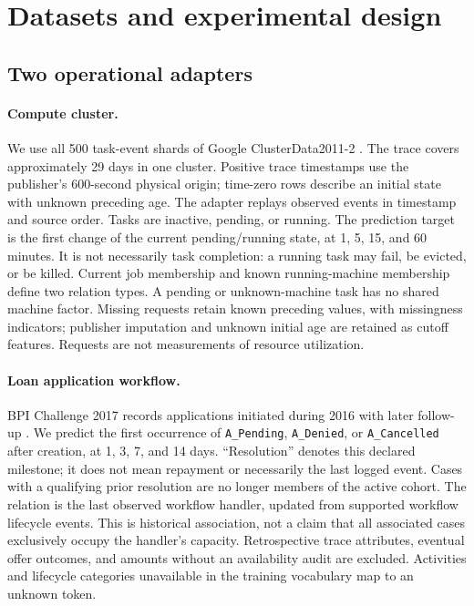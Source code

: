 \section{Datasets and experimental design}
\subsection{Two operational adapters}
\paragraph{Compute cluster.}
We use all 500 task-event shards of Google ClusterData2011-2
\citep{google2011}. The trace covers approximately 29 days in one cluster.
Positive trace timestamps use the publisher's 600-second physical origin;
time-zero rows describe an initial state with unknown preceding age. The
adapter replays observed events in timestamp and source order. Tasks are
inactive, pending, or running. The prediction target is the first change of
the current pending/running state, at 1, 5, 15, and 60 minutes. It is not
necessarily task completion: a running task may fail, be evicted, or be killed.
Current job membership and known running-machine membership define two
relation types. A pending or unknown-machine task has no shared machine factor.
Missing requests retain known preceding values, with missingness indicators;
publisher imputation and unknown initial age are retained as cutoff features.
Requests are not measurements of resource utilization.

\paragraph{Loan application workflow.}
BPI Challenge 2017 records applications initiated during 2016 with later
follow-up \citep{vandongen2017}. We predict the first occurrence of
\texttt{A\_Pending}, \texttt{A\_Denied}, or \texttt{A\_Cancelled} after creation,
at 1, 3, 7, and 14 days. ``Resolution'' denotes this declared milestone; it
does not mean repayment or necessarily the last logged event. Cases with a
qualifying prior resolution are no longer members of the active cohort.
The relation is the last observed workflow handler, updated from supported
workflow lifecycle events. This is historical association, not a claim that
all associated cases exclusively occupy the handler's capacity. Retrospective
trace attributes, eventual offer outcomes, and amounts without an availability
audit are excluded. Activities and lifecycle categories unavailable in the
training vocabulary map to an unknown token.

